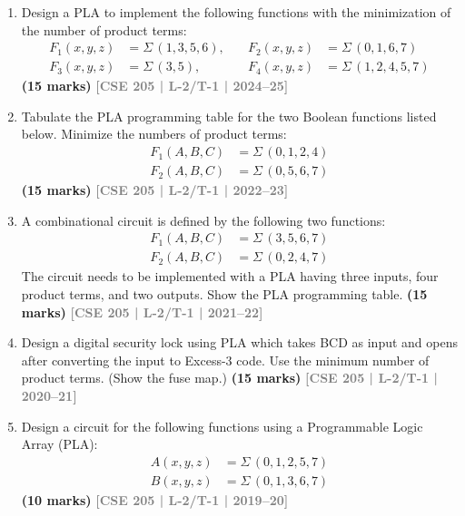 \documentclass[12pt,a3paper]{article}
\newcommand{\yr}[1]{\hfill\textcolor{gray}{\small\textbf{[#1]}}}
\newcommand{\mk}[1]{\textcolor{orange!70!black}{\small\textbf{(#1 marks)}}}
\begin{document}
\begin{enumerate}

\item Design a PLA to implement the following functions with the minimization of the number of product terms:
\begin{align*}
  F_1(x, y, z) &= \Sigma\,(1,3,5,6),\quad & F_2(x, y, z) &= \Sigma\,(0,1,6,7) \\
  F_3(x, y, z) &= \Sigma\,(3,5),\quad & F_4(x, y, z) &= \Sigma\,(1,2,4,5,7)
\end{align*}
\mk{15} \yr{CSE 205 | L-2/T-1 | 2024--25}

\item Tabulate the PLA programming table for the two Boolean functions listed below. Minimize the numbers of product terms:
\begin{align*}
  F_1(A, B, C) &= \Sigma\,(0, 1, 2, 4) \\
  F_2(A, B, C) &= \Sigma\,(0, 5, 6, 7)
\end{align*}
\mk{15} \yr{CSE 205 | L-2/T-1 | 2022--23}

\item A combinational circuit is defined by the following two functions:
\begin{align*}
  F_1(A, B, C) &= \Sigma\,(3, 5, 6, 7) \\
  F_2(A, B, C) &= \Sigma\,(0, 2, 4, 7)
\end{align*}
The circuit needs to be implemented with a PLA having three inputs, four product terms, and two outputs. Show the PLA programming table.
\mk{15} \yr{CSE 205 | L-2/T-1 | 2021--22}

\item Design a digital security lock using PLA which takes BCD as input and opens after converting the input to Excess-3 code. Use the minimum number of product terms. (Show the fuse map.)
\mk{15} \yr{CSE 205 | L-2/T-1 | 2020--21}


\item Design a circuit for the following functions using a Programmable Logic Array (PLA):
\begin{align*}
  A(x,y,z) &= \Sigma\,(0,1,2,5,7) \\
  B(x,y,z) &= \Sigma\,(0,1,3,6,7)
\end{align*}
\mk{10} \yr{CSE 205 | L-2/T-1 | 2019--20}


\end{enumerate}
\end{document}
